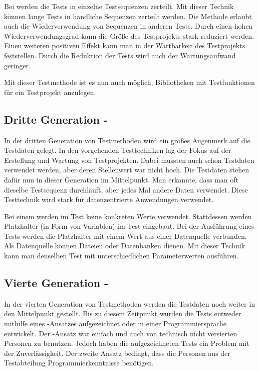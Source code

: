 Bei  werden die Tests in einzelne Testsequenzen zerteilt. Mit dieser Technik können lange Tests in handliche Sequenzen zerteilt werden. Die Methode erlaubt auch die Wiederverwendung von Sequenzen in anderen Tests. Durch einen hohen Wiederverwendungsgrad kann die Größe des Testprojekts stark reduziert werden. Einen weiteren positiven Effekt kann man in der Wartbarkeit des Testprojekts feststellen. Durch die Reduktion der Tests wird auch der Wartungsaufwand geringer.

\SuperPar
Mit dieser Testmethode ist es nun auch möglich, Bibliotheken mit Testfunktionen für ein Testprojekt anzulegen. 

\subsection{Dritte Generation - }

In der dritten Generation von Testmethoden wird ein großes Augenmerk auf die Testdaten gelegt. In den vorgehenden Testtechniken lag der Fokus auf der Erstellung und Wartung von Testprojekten. Dabei mussten auch schon Testdaten verwendet werden, aber deren Stellenwert war nicht hoch. Die Testdaten stehen dafür nun in dieser Generation im Mittelpunkt. Man erkannte, dass man oft dieselbe Testsequenz durchläuft, aber jedes Mal andere Daten verwendet. Diese Testtechnik wird stark für datenzentrierte Anwendungen verwendet. 

\SuperPar
Bei einem  werden im Test keine konkreten Werte verwendet. Stattdessen werden Platzhalter (in Form von Variablen) im Test eingebaut. Bei der Ausführung eines Tests werden die Platzhalter mit einem Wert aus einer Datenquelle verbunden. Als Datenquelle können Dateien oder Datenbanken dienen. Mit dieser Technik kann man denselben Test mit unterschiedlichen Parameterwerten ausführen. 

\subsection{Vierte Generation - }

In der vierten Generation von Testmethoden werden die Testdaten noch weiter in den Mittelpunkt gestellt. Bis zu diesem Zeitpunkt wurden die Tests entweder mithilfe eines -Ansatzes aufgezeichnet oder in einer Programmiersprache entwickelt. Der -Ansatz war einfach und auch von technisch nicht versierten Personen zu benutzen. Jedoch haben die aufgezeichneten Tests ein Problem mit der Zuverlässigkeit. Der zweite Ansatz  bedingt, dass die Personen aus der Testabteilung Programmierkenntnisse benötigen.

